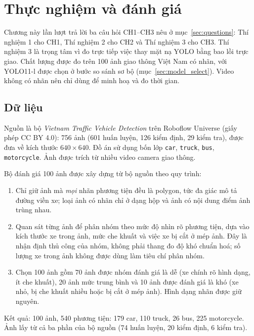 \chapter{Thực nghiệm và đánh giá}
\label{chap:exp}

Chương này lần lượt trả lời ba câu hỏi CH1--CH3 nêu ở mục~\ref{sec:questions}: Thí nghiệm 1 cho CH1, Thí nghiệm 2 cho CH2
và Thí nghiệm 3 cho CH3. Thí nghiệm 3 là trọng tâm vì đo trực tiếp việc thay mặt nạ YOLO bằng bao lồi trực giao.
Chất lượng được đo trên 100 ảnh giao thông Việt Nam có nhãn, với YOLO11-l được chọn ở bước so sánh sơ bộ (mục~\ref{sec:model_select}).
Video không có nhãn nên chỉ dùng để minh hoạ và đo thời gian.

\section{Dữ liệu}
\label{sec:data}

Nguồn là bộ \emph{Vietnam Traffic Vehicle Detection} trên Roboflow Universe \cite{roboflowvn} (giấy phép CC BY 4.0):
756 ảnh (601 huấn luyện, 126 kiểm định, 29 kiểm tra), được đưa về kích thước $640\times640$.
Đồ án sử dụng bốn lớp \texttt{car}, \texttt{truck}, \texttt{bus}, \texttt{motorcycle}. Ảnh được trích từ nhiều video camera giao thông.

Bộ đánh giá 100 ảnh được xây dựng từ bộ nguồn theo quy trình:
\begin{enumerate}
  \item Chỉ giữ ảnh mà \emph{mọi} nhãn phương tiện đều là polygon, tức đa giác mô tả đường viền xe; loại ảnh có nhãn chỉ ở dạng hộp và ảnh có nội dung điểm ảnh trùng nhau.
  \item Quan sát từng ảnh để phân nhóm theo mức độ nhìn rõ phương tiện, dựa vào kích thước xe trong ảnh,
        mức che khuất và việc xe bị cắt ở mép ảnh. Đây là nhận định thủ công của nhóm, không phải thang đo độ khó chuẩn hoá;
        số lượng xe trong ảnh không được dùng làm tiêu chí phân nhóm.
  \item Chọn 100 ảnh gồm 70 ảnh được nhóm đánh giá là dễ (xe chính rõ hình dạng, ít che khuất),
        20 ảnh mức trung bình và 10 ảnh được đánh giá là khó (xe nhỏ, bị che khuất nhiều hoặc bị cắt ở mép ảnh).
        Hình dạng nhãn được giữ nguyên.
\end{enumerate}
Kết quả: 100 ảnh, 540 phương tiện: 179 car, 110 truck, 26 bus, 225 motorcycle.
Ảnh lấy từ cả ba phần của bộ nguồn (74 huấn luyện, 20 kiểm định, 6 kiểm tra).

